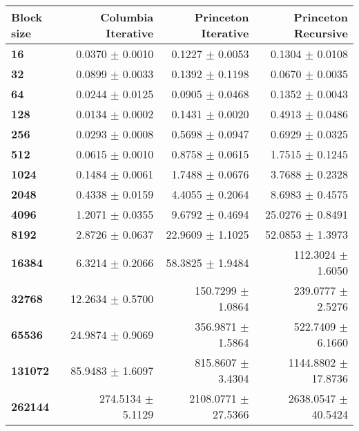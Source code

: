 \begin{tabular}{lrrr}\toprule
\textbf{Block size}  & \textbf{Columbia Iterative} & \textbf{Princeton Iterative} & \textbf{Princeton Recursive}\\\midrule
\textbf{16}  & 0.0370 $\pm$ 0.0010 & 0.1227 $\pm$ 0.0053 & 0.1304 $\pm$ 0.0108\\
\textbf{32}  & 0.0899 $\pm$ 0.0033 & 0.1392 $\pm$ 0.1198 & 0.0670 $\pm$ 0.0035\\
\textbf{64}  & 0.0244 $\pm$ 0.0125 & 0.0905 $\pm$ 0.0468 & 0.1352 $\pm$ 0.0043\\
\textbf{128}  & 0.0134 $\pm$ 0.0002 & 0.1431 $\pm$ 0.0020 & 0.4913 $\pm$ 0.0486\\
\textbf{256}  & 0.0293 $\pm$ 0.0008 & 0.5698 $\pm$ 0.0947 & 0.6929 $\pm$ 0.0325\\
\textbf{512}  & 0.0615 $\pm$ 0.0010 & 0.8758 $\pm$ 0.0615 & 1.7515 $\pm$ 0.1245\\
\textbf{1024}  & 0.1484 $\pm$ 0.0061 & 1.7488 $\pm$ 0.0676 & 3.7688 $\pm$ 0.2328\\
\textbf{2048}  & 0.4338 $\pm$ 0.0159 & 4.4055 $\pm$ 0.2064 & 8.6983 $\pm$ 0.4575\\
\textbf{4096}  & 1.2071 $\pm$ 0.0355 & 9.6792 $\pm$ 0.4694 & 25.0276 $\pm$ 0.8491\\
\textbf{8192}  & 2.8726 $\pm$ 0.0637 & 22.9609 $\pm$ 1.1025 & 52.0853 $\pm$ 1.3973\\
\textbf{16384}  & 6.3214 $\pm$ 0.2066 & 58.3825 $\pm$ 1.9484 & 112.3024 $\pm$ 1.6050\\
\textbf{32768}  & 12.2634 $\pm$ 0.5700 & 150.7299 $\pm$ 1.0864 & 239.0777 $\pm$ 2.5276\\
\textbf{65536}  & 24.9874 $\pm$ 0.9069 & 356.9871 $\pm$ 1.5864 & 522.7409 $\pm$ 6.1660\\
\textbf{131072}  & 85.9483 $\pm$ 1.6097 & 815.8607 $\pm$ 3.4304 & 1144.8802 $\pm$ 17.8736\\
\textbf{262144} & 274.5134 $\pm$ 5.1129 & 2108.0771 $\pm$ 27.5366 & 2638.0547 $\pm$ 40.5424\\
\bottomrule
\end{tabular}
